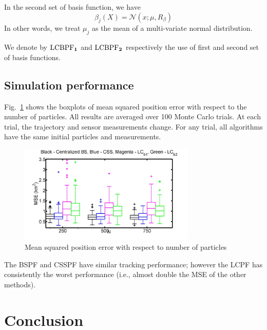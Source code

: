 \documentclass[10pt,letterpaper,final]{article}
\begin{document}
In the second set of basis function, we have
\begin{equation}
\beta_j(X) = \mathcal{N}(x; \mu, R_{\beta})
\end{equation}
In other words, we treat $\mu_j$ as the mean of a multi-variate normal distribution. 

We denote by $\text{LCBPF}_{\bf 1}$ and $\text{LCBPF}_{\bf 2}$ respectively the use of first and second set of basis functions. 

\subsection{Simulation performance}
Fig.~\ref{fig:MSE} shows the boxplots of mean squared position error with respect to the number of particles. All results are averaged over 100 Monte Carlo trials. At each trial, the trajectory and sensor measurements change. For any trial, all algorithms have the same initial particles and measurements. 

\begin{figure}
\centering
\includegraphics[width=0.75\textwidth]{Figures/MSE}
\caption{Mean squared position error with respect to number of particles}
\label{fig:MSE}
\end{figure}

The BSPF and CSSPF have similar tracking performance; however the LCPF has consistently the worst performance (i.e., almost double the MSE of the other methods). 


\section{Conclusion}
\end{document}
